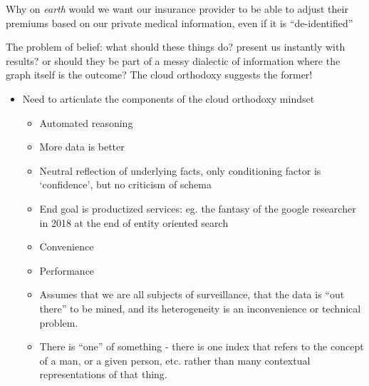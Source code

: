 Why on \emph{earth} would we want our insurance provider to be able to
adjust their premiums based on our private medical information, even if
it is ``de-identified''

The problem of belief: what should these things do? present us instantly
with results? or should they be part of a messy dialectic of information
where the graph itself is the outcome? The cloud orthodoxy suggests the
former!

\begin{itemize}

\item
  Need to articulate the components of the cloud orthodoxy mindset

  \begin{itemize}
  
  \item
    Automated reasoning
  \item
    More data is better
  \item
    Neutral reflection of underlying facts, only conditioning factor is
    `confidence', but no criticism of schema
  \item
    End goal is productized services: eg. the fantasy of the google
    researcher in 2018 at the end of entity oriented search
  \item
    Convenience
  \item
    Performance
  \item
    Assumes that we are all subjects of surveillance, that the data is
    ``out there'' to be mined, and its heterogeneity is an inconvenience
    or technical problem.
  \item
    There is ``one'' of something - there is one index that refers to
    the concept of a man, or a given person, etc. rather than many
    contextual representations of that thing.

    \begin{itemize}
    

\end{itemize}
\end{itemize}
\end{itemize}
